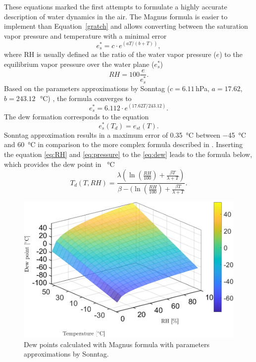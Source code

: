 These equations marked the first attempts to formulate a highly accurate description of water dynamics in the air. The Magnus formula is easier to implement than Equation~\ref{gratch} and allows converting between the saturation vapor pressure and temperature with a minimal error~\cite{magnus}
\begin{equation}
    e^{*}_{s} = c \cdot e^{(aT/(b+T))},
\end{equation}
where \gls{RH} is usually defined as the ratio of the water vapor pressure ($e$) to the equilibrium vapor pressure over the water plane ($e^{*}_{s}$)
\begin{equation}
    RH = 100\frac{e}{e^{*}_{s}}.
    \label{eq:RH}
\end{equation}
Based on the parameters approximations by Sonntag ($c=6.11$\,hPa, $a=17.62$, $b=243.12$\,\SI{}{\celsius}) \cite{magnus}, the formula converges to
\begin{equation}
    e^{*}_{s} = 6.112 \cdot e^{(17.62T/243.12)}.
    \label{eq:pressure}
\end{equation}
The dew formation corresponds to the equation
\begin{equation}
    e^{*}_{s}(T_{d}) = e_{st}(T).
    \label{eq:dew}
\end{equation}
Sonntag approximation results in a maximum error of \SI{0.35}{\celsius} between \SI{-45}{\celsius} and \SI{60}{\celsius} in comparison to the more complex formula described in \cite{hardy}. 
Inserting the equation \ref{eq:RH} and \ref{eq:pressure} to the \ref{eq:dew} leads to the formula below, which provides the dew point in \SI{}{\celsius}
\begin{equation}
    T_{d}(T, RH) = \frac{\lambda(\ln(\frac{RH}{100})+\frac{\beta T}{\lambda + T})}{\beta - (\ln(\frac{RH}{100})+\frac{\beta T}{\lambda + T}}.
    \label{eq:td}
\end{equation}
\begin{figure}[!h]
\centering
\includegraphics[width=0.65\columnwidth]{Chapter5/images/dewpointmagnus.png}
\caption{Dew points calculated with Magnus formula with parameters approximations by Sonntag.}
\label{fig:dewpointmagnus}
\end{figure}

